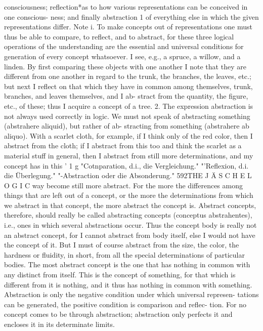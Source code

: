 consciousness;
reflection*as to how various representations can be conceived in one conscious-
ness; and finally
abstraction 1 of everything else in which the given representations differ.
Note i. To make concepts out of representations one must thus be able to
compare, to reflect, and to abstract, for these three logical operations of the
understanding are the essential and universal conditions for generation
of every concept whatsoever. I see, e.g., a spruce, a willow, and a linden.
By first comparing these objects with one another I note that they are
different from one another in regard to the trunk, the branches, the
leaves, etc.; but next I reflect on that which they have in common
among themselves, trunk, branches, and leaves themselves, and I ab-
stract from the quantity, the figure, etc., of these; thus I acquire a
concept of a tree.
2. The expression abstraction is not always used correctly in logic. We must
not speak of abstracting something (abstrahere aliquid), but rather of ab-
stracting from something (abstrahere ab aliquo). With a scarlet cloth, for
example, if I think only of the red color, then I abstract from the cloth; if I
abstract from this too and think the scarlet as a material stuff in general,
then I abstract from still more determinations, and my concept has in this
'
1
g
"Cotnparation, d.i., die Vergleichung."
"'Reflexion, d.i. die Überlegung."
"-Abstraction oder die Absonderung."
592THE J Ä S C H E L O G I C
way become still more abstract. For the more the differences among
things that are left out of a concept, or the more the determinations from
which we abstract in that concept, the more abstract the concept is.
Abstract concepts, therefore, should really be called abstracting concepts
(conceptus abstrahentes), i.e., ones in which several abstractions occur.
Thus the concept body is really not an abstract concept, for I cannot
abstract from body itself, else I would not have the concept of it. But I
must of course abstract from the size, the color, the hardness or fluidity,
in short, from all the special determinations of particular bodies. The
most abstract concept is the one that has nothing in common with any
distinct from itself. This is the concept of something, for that which is
different from it is nothing, and it thus has nothing in common with
something.
Abstraction is only the negative condition under which universal represen-
tations can be generated, the positive condition is comparison and reflec-
tion. For no concept comes to be through abstraction; abstraction only
perfects it and encloses it in its determinate limits.
